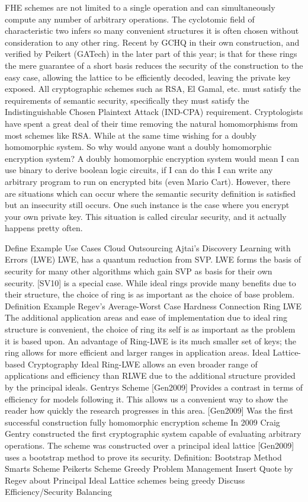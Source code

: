 FHE schemes are not limited to a single operation and can
simultaneously compute any number of arbitrary operations. The
cyclotomic field of characteristic two infers so many convenient
structures it is often chosen without consideration to any other ring.
Recent by GCHQ in their own construction, and verified by Peikert
(GATech) in the later part of this year; is that for these rings the
mere guarantee of a short basis reduces the security of the
construction to the easy case, allowing the lattice to be efficiently
decoded, leaving the private key exposed. All cryptographic schemes
such as RSA, El Gamal, etc. must satisfy the requirements of semantic
security, specifically they must satisfy the Indistinguishable Chosen
Plaintext Attack (IND-CPA) requirement. Cryptologists have spent a
great deal of their time removing the natural homomorphisms from most
schemes like RSA. While at the same time wishing for a doubly
homomorphic system. So why would anyone want a doubly homomorphic
encryption system? A doubly homomorphic encryption system would mean I
can use binary to derive boolean logic circuits, if I can do this I can
write any arbitrary program to run on encrypted bits (even Mario Cart).
However, there are situations which can occur where the semantic
security definition is satisfied but an insecurity still occurs. One
such instance is the case where you encrypt your own private key. This
situation is called circular security, and it actually happens pretty
often.

Define 
Example 
Use Cases 
Cloud Outsourcing 
Ajtai's Discovery 
Learning with Errors (LWE) 
LWE, has a quantum reduction from SVP. LWE forms the basis of security for many other algorithms which gain SVP as basis for their own security. [SV10] is a special case. While ideal rings provide many benefits due to their structure, the choice of ring is as
important as the choice of base problem. 
Definition 
Example 
Regev's Average-Worst Case Hardness Connection 
Ring LWE 
The additional application areas and ease of implementation due to ideal ring structure is convenient, the choice of ring its self is as important as the problem it is based upon. An
advantage of Ring-LWE is its much smaller set of keys; the ring allows for more efficient and larger ranges in application areas. 
Ideal Lattice-based Cryptography 
Ideal Ring-LWE allows an even broader range of applications and efficiency than RLWE due to the additional structure provided by the principal ideals. 
Gentrys Scheme [Gen2009] 
Provides a contrast in terms of efficiency for models following it. This allows us a convenient way to show the reader how quickly the research progresses in this area. 
[Gen2009] Was the first successful construction fully homomorphic encryption scheme In 2009 Craig Gentry constructed the first cryptographic system capable of evaluating arbitrary operations. The scheme was constructed over a principal ideal lattice [Gen2009] uses a bootstrap method to prove its security.
Definition: Bootstrap Method 
Smarts Scheme 
Peikerts Scheme 
Greedy Problem Management 
Insert Quote by Regev about Principal Ideal Lattice schemes being greedy 
Discuss Efficiency/Security Balancing
